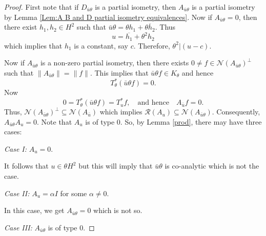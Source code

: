 \documentclass[12pt]{amsart}
\newcommand{\cln}{\mathcal{N}}
\newcommand{\clr}{\mathcal{R}}
\newcommand{\NI}{\noindent}
\newcommand{\h}{{H}^2}
\theoremstyle{definition}
\theoremstyle{plain}
\theoremstyle{definition}
\numberwithin{equation}{section}
\begin{document}
	
\begin{proof}
First note that if $D_{\bar{u}\theta}$ is a partial isometry, then $A_{\bar{u}\theta}$ is a partial isometry by Lemma \ref{Lem:A B and D partial isometry equivalences}. Now if $A_{\bar{u}\theta} = 0$, then there exist $h_1, h_2 \in H^2$ such that
$\bar{u}\theta= \theta h_1 +\overline{\theta h_2}$.
Thus
\[
{u}=\overline{h_1}+{\theta^2 h_2}
\]
which implies that $h_1$ is a constant, say $c$. Therefore, $\theta^2 |(u-c)$.
		
Now if $A_{\bar{u} \theta}$ is a non-zero partial isometry, then there exists $0 \neq f \in \cln(A_{\bar{u}\theta})^{\perp}$ such that $\|A_{\bar{u}\theta} \| = \|f \|$.
This implies that $\bar{u}\theta f \in K_\theta$ and hence
\[
T_\theta^* (\bar{u}\theta f)=0.
\]
Now
\[
0=T_\theta^* (\bar{u}\theta f)= T_u^* f, \quad \mbox{and hence} \quad A_{\bar{u}} f =0.
\]
Thus, $\cln (A_{\bar{u}\theta})^\perp \subseteq \cln (A_{\bar{u}})$ which implies 	$\clr(A_u) \subseteq \cln(A_{\bar{u}\theta})$. Consequently, $A_{\bar{u}\theta} A_u=0$. Note that $A_{u}$ is of type $0$. So, by Lemma \ref{prod}, there may have three cases:

\NI		
\textit{Case I:} $A_{u}=0$.

It follows that $u\in\theta \h$ but this  will imply that $\bar{u}\theta$ is co-analytic which is not the case.
\vspace{.1cm}
	
\NI		
\textit{Case II:} $A_{u}= \alpha I$ for some $\alpha \neq 0$.

In this case, we get $A_{\bar{u}\theta}=0$ which is not so.
\vspace{.1cm}

\NI		
\textit{Case III:} $A_{\bar{u}\theta}$ is of type $0$.


\end{proof}
\end{document}
